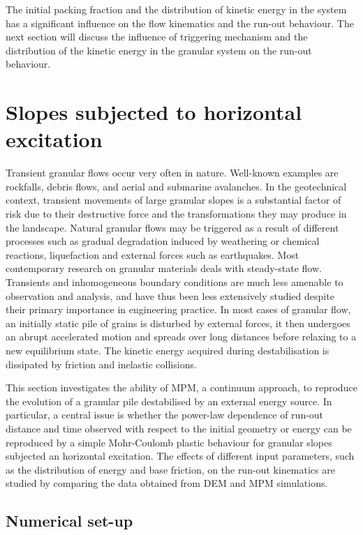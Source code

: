 The initial packing fraction and the distribution of kinetic energy in the 
system has a significant influence on the flow kinematics and the run-out 
behaviour. The next section will discuss the influence of triggering mechanism 
and the distribution of the kinetic energy in the granular system on the 
run-out behaviour.  


\section{Slopes subjected to horizontal excitation}
\label{sec:slope}
Transient granular flows occur very often in nature. Well-known examples are 
rockfalls, debris flows, and aerial and submarine avalanches. In the 
geotechnical context, transient movements of large granular slopes 
is a substantial factor of risk due to their destructive force and the 
transformations they may produce in the landscape. Natural granular flows 
may be triggered as a result of different processes such as gradual 
degradation induced by weathering or chemical reactions, liquefaction and 
external forces such as earthquakes. Most contemporary research on granular 
materials deals with steady-state flow. Transients and inhomogeneous 
boundary conditions are much less amenable to observation and analysis, and 
have thus been less extensively studied despite their primary importance in 
engineering practice. In most cases of granular flow, an initially static pile 
of grains is disturbed by external forces, it then undergoes an abrupt 
accelerated motion and spreads over long distances before relaxing to a new 
equilibrium state. The kinetic energy acquired during destabilisation is 
dissipated by friction and inelastic collisions.

This section investigates the ability of MPM, a continuum approach, to 
reproduce the evolution of a granular pile destabilised by an external energy 
source. In particular, a central issue is whether the power-law dependence of 
run-out distance and time observed with respect to the initial geometry or 
energy can be reproduced by a simple Mohr-Coulomb plastic behaviour for 
granular slopes subjected an horizontal excitation. The effects of different 
input parameters, such as the distribution of energy and base friction, on the 
run-out kinematics are studied by comparing the data obtained from DEM and MPM 
simulations.

\subsection{Numerical set-up}
\label{sec:num}

